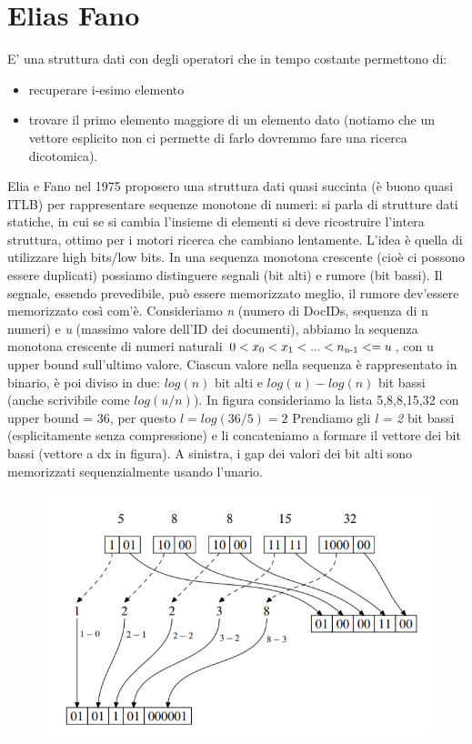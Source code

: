 \documentclass[12pt,italian]{report}
\begin{document}
\section{Elias Fano}
\label{eliasfano} 
E' una struttura dati con degli operatori che in tempo costante permettono di:
\begin{itemize}
    \item recuperare i-esimo elemento
    \item trovare il primo elemento maggiore di un elemento dato (notiamo che un vettore esplicito non ci permette di farlo dovremmo fare una ricerca dicotomica).
\end{itemize}

Elia e Fano nel 1975 proposero una struttura dati quasi succinta (è buono quasi ITLB) per rappresentare sequenze monotone di numeri: si parla di strutture dati statiche, in cui se si cambia l'insieme di elementi si deve ricostruire l'intera struttura, ottimo per i motori ricerca che cambiano lentamente.
\bigbreak
L'idea è quella di utilizzare high bits/low bits. In una sequenza monotona crescente (cioè ci possono essere duplicati) possiamo distinguere segnali (bit alti) e rumore (bit bassi). Il segnale, essendo prevedibile, può essere memorizzato meglio, il rumore dev'essere memorizzato così com'è. 
\bigbreak
Consideriamo \textit{n} (numero di DocIDs, sequenza di n numeri) e \textit{u} (massimo valore dell'ID dei documenti), abbiamo la sequenza monotona crescente di numeri naturali $0 < x\textsubscript{0} < x\textsubscript{1} < ... < n\textsubscript{n-1} <= u$, con u upper bound sull'ultimo valore. Ciascun valore nella sequenza è rappresentato in binario, è poi diviso in due: $log(n)$ bit alti e $log(u)-log(n)$ bit bassi (anche scrivibile come $log(u/n)$).
\bigbreak
In figura consideriamo la lista 5,8,8,15,32 con upper bound = 36, per questo $l = log(36/5) = 2$
Prendiamo gli \textit{l = 2} bit bassi (esplicitamente senza compressione) e li concateniamo a formare il vettore dei bit bassi (vettore a dx in figura). A sinistra, i gap dei valori dei bit alti sono memorizzati sequenzialmente usando l'unario. 

\begin{figure}[h]
	\centering
	\includegraphics[width=120mm]{image/eliasfano1.png}
	\label{fig:ef1}
	\caption{}
\end{figure}
\end{document}
